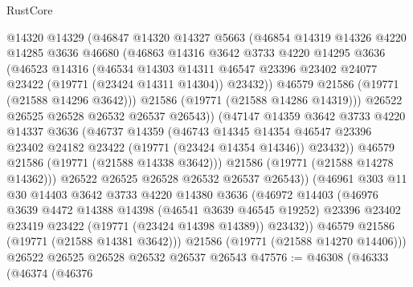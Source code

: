 \begin{lexlean}{RustCore}
\begin{coremodule}
              @14320
              @14329
              (@46847
                @14320
                @14327
                @5663
                (@46854
                  @14319
                  @14326
                  @4220
                  @14285
                  @3636
                  @46680
                  (@46863
                    @14316
                    @3642
                    @3733
                    @4220
                    @14295
                    @3636
                    (@46523
                      @14316
                      (@46534
                        @14303
                        @14311
                        @46547
                        @23396
                        @23402
                        @24077
                        @23422
                        (@19771 (@23424 @14311 @14304))
                        @23432))
                    @46579
                    @21586
                    (@19771 (@21588 @14296 @3642)))
                  @21586
                  (@19771 (@21588 @14286 @14319)))
                @26522
                @26525
                @26528
                @26532
                @26537
                @26543))
            (@47147
              @14359
              @3642
              @3733
              @4220
              @14337
              @3636
              (@46737
                @14359
                (@46743
                  @14345
                  @14354
                  @46547
                  @23396
                  @23402
                  @24182
                  @23422
                  (@19771 (@23424 @14354 @14346))
                  @23432))
              @46579
              @21586
              (@19771 (@21588 @14338 @3642)))
            @21586
            (@19771 (@21588 @14278 @14362)))
          @26522
          @26525
          @26528
          @26532
          @26537
          @26543))
      (@46961
        @303
        @11
        @30
        @14403
        @3642
        @3733
        @4220
        @14380
        @3636
        (@46972
          @14403
          (@46976
            @3639
            @4472
            @14388
            @14398
            (@46541 @3639 @46545 @19252)
            @23396
            @23402
            @23419
            @23422
            (@19771 (@23424 @14398 @14389))
            @23432))
        @46579
        @21586
        (@19771 (@21588 @14381 @3642)))
      @21586
      (@19771 (@21588 @14270 @14406)))
    @26522
    @26525
    @26528
    @26532
    @26537
    @26543
@47576 := @46308
    (@46333
      (@46374
        (@46376

\end{coremodule}
\end{lexlean}
